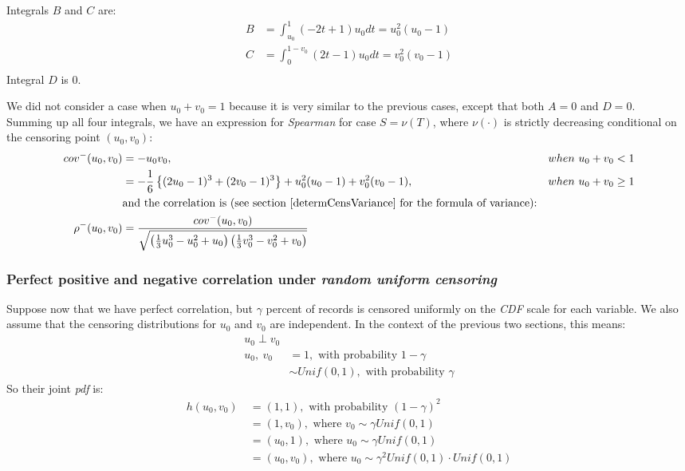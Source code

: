\documentclass[]{article}
\begin{document}
Integrals $B$ and $C$ are:
	$$
	\begin{aligned}
    B &= \int_{u_0}^1 (-2t + 1)u_0 dt =u_0^2(u_0 - 1)\\
    C &= \int_{0}^{1-v_0} (2t - 1)u_0 dt =v_0^2(v_0 - 1)\\
	\end{aligned}
	$$
Integral $D$ is $0$.

We did not consider a case when $u_0+v_0 = 1$ because it is very similar to the previous cases, except that both $A=0$ and $D=0$.\\
Summing up all four integrals, we have an expression for \emph{Spearman} for case $S=\nu(T)$, where $\nu(\cdot)$ is strictly decreasing conditional on the censoring point $(u_0, v_0)$:
	$$
	\begin{aligned}
    cov^-(u_0, v_0) &= -u_0v_0, &when~u_0 + v_0 < 1\\
    &= -\frac{1}{6}\left\{  (2u_0 - 1)^3 + (2v_0 - 1)^3 \right\} + u_0^2(u_0 - 1) + v_0^2(v_0 - 1), &when~u_0 + v_0 \geq 1\\
    &\text{and the correlation is (see section \ref{determCensVariance} for the formula of variance):}\\
      \rho^- (u_0, v_0) &= \frac{cov^-(u_0, v_0)}{\sqrt{\left(  \frac{1}{3} u_0^3 - u_0^2 + u_0  \right)  \left(  \frac{1}{3} v_0^3 - v_0^2 + v_0  \right)}}
	\end{aligned}
	$$

\subsubsection{Perfect positive and negative correlation under \emph{random uniform censoring} }

Suppose now that we have perfect correlation, but $\gamma$ percent of records is censored uniformly on the \emph{CDF} scale for each variable. We also assume that the censoring distributions for $u_0$ and $v_0$ are independent. In the context of the previous two sections, this means:
  $$
  \begin{aligned}
    u_0 \perp v_0 &\\
    u_0,~v_0~&=1, \text{ with probability }1-\gamma  \\
       &\sim Unif(0, 1), \text{ with probability }\gamma
  \end{aligned}
  $$
So their joint \emph{pdf} is:
  $$
  \begin{aligned}
    h(u_0, v_0)~&=(1, 1), \text{ with probability }(1-\gamma)^2  \\
                &=(1, v_0), \text{ where } v_0\sim \gamma Unif(0, 1) \\
                &=(u_0, 1), \text{ where } u_0\sim \gamma Unif(0, 1) \\
                &=(u_0, v_0), \text{ where } u_0\sim \gamma^2 Unif(0, 1)\cdot Unif(0, 1) \\
  \end{aligned}
  $$
\end{document}
